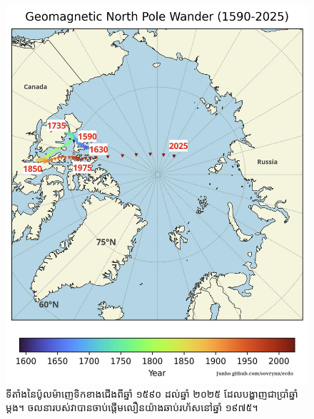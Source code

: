 \documentclass[10pt,twocolumn,letterpaper]{article}
\begin{document}
\begin{figure}[t]
\begin{center}
   \includegraphics[width=1\linewidth]{npw.jpg}
\end{center}
   \caption{ទីតាំងនៃប៉ូលម៉ាញេទិកខាងជើងពីឆ្នាំ ១៥៩០ ដល់ឆ្នាំ ២០២៥ ដែលបង្ហាញជាប្រាំឆ្នាំម្តង។ ចលនារបស់វាបានចាប់ផ្តើមលឿនយ៉ាងឆាប់រហ័សនៅឆ្នាំ ១៩៧៥។}
\label{fig:13}
\label{fig:onecol}
\end{figure}
\end{document}

